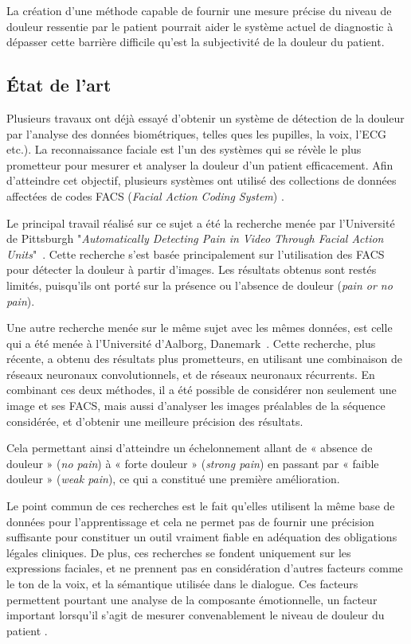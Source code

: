 \documentclass[french]{article}
\begin{document}
La création  d’une méthode capable  de fournir une  mesure précise du  niveau de
douleur ressentie par le patient pourrait  aider le système actuel de diagnostic
à dépasser  cette barrière  difficile qu'est  la subjectivité  de la  douleur du
patient.

\subsection{État de l’art}
\label{sec:org8119c98}
Plusieurs travaux  ont déjà essayé d’obtenir  un système de détection  de la
douleur par  l’analyse des  données biométriques, telles  ques les  pupilles, la
voix, l'ECG etc.). La reconnaissance faciale est l'un des systèmes qui se révèle
le  plus   prometteur  pour  mesurer   et  analyser  la  douleur   d'un  patient
efficacement.  Afin d’atteindre cet objectif, plusieurs systèmes ont utilisé des
collections  de données  affectées  de codes  FACS (\emph{Facial Action  Coding System}) \cite{lucey2011painful}.

Le  principal  travail  réalisé sur  ce  sujet  a  été  la recherche  menée  par
l’Université de Pittsburgh "\emph{Automatically  Detecting Pain in Video Through Facial  Action Units}"~\cite{lucey2011automatically}.
Cette  recherche s’est basée  principalement sur  l’utilisation des  FACS  pour
détecter  la douleur  à partir d'images. Les résultats obtenus sont restés
limités, puisqu'ils ont porté sur la présence ou l’absence de douleur (\emph{pain or
no pain}). 

Une autre recherche  menée sur le même  sujet avec les mêmes  données, est celle
qui a été menée à l’Université d’Aalborg, Danemark~\cite{bellantonio2016spatio}.
 Cette  recherche, plus récente,  a obtenu des  résultats  plus  prometteurs,
en  utilisant  une  combinaison  de  réseaux neuronaux convolutionnels, et de
réseaux neuronaux récurrents.  En combinant ces deux méthodes, il  a été
possible de  considérer non seulement une  image et ses FACS, mais aussi
d’analyser les images  préalables de la séquence considérée, et d’obtenir  une
meilleure  précision  des  résultats. 

Cela  permettant  ainsi d’atteindre un échelonnement allant de « absence de
douleur » (\emph{no pain}) à « forte douleur » (\emph{strong pain}) en  passant par «
faible douleur » (\emph{weak pain}), ce qui a constitué une première amélioration.


Le point commun de ces recherches est le fait qu’elles utilisent la même base de
données pour l’apprentissage et cela ne permet pas de fournir une précision
suffisante pour constituer un outil vraiment fiable en adéquation des
obligations légales cliniques. De plus, ces recherches se fondent uniquement sur
les expressions faciales, et ne prennent pas en considération d’autres facteurs
comme le ton de la voix, et la sémantique utilisée dans le dialogue. Ces
facteurs permettent pourtant une analyse de la composante émotionnelle, un facteur
important lorsqu’il s’agit de mesurer convenablement le niveau de douleur du
patient \cite{hale1997emotional}.   
\end{document}
